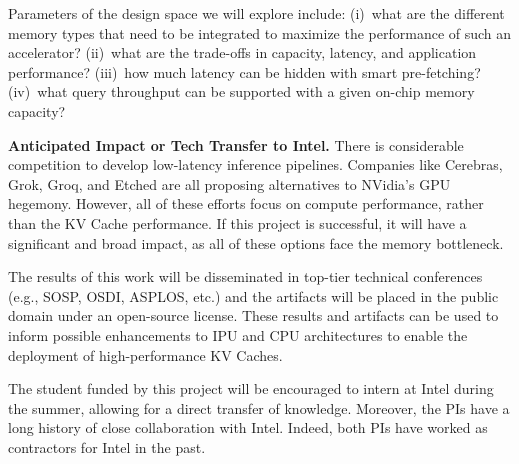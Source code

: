 \documentclass[11pt]{article}
\def\PAR#1{\par\medskip\noindent\textbf{#1}}
\begin{document}
Parameters of the design space we will explore include: (i)~what are
the different memory types that need to be integrated to maximize the
performance of such an accelerator? (ii)~what are the trade-offs in
capacity, latency, and application performance? (iii)~how much latency
can be hidden with smart pre-fetching? (iv)~what query throughput can
be supported with a given on-chip memory capacity?




\PAR{Anticipated Impact or Tech Transfer to Intel.}
%
There is considerable competition to develop low-latency
inference pipelines. Companies like Cerebras, Grok, Groq, and
Etched are all proposing alternatives to NVidia's GPU
hegemony. However, all of these efforts focus on compute
performance, rather than the KV Cache performance. If this
project is successful, it will have a significant and broad
impact, as all of these options face the memory bottleneck.

The results of this work will be disseminated in top-tier technical
conferences (e.g., SOSP, OSDI, ASPLOS, etc.) and the artifacts will be
placed in the public domain under an open-source license.
These results and artifacts can be used to inform possible
enhancements to IPU and CPU architectures to enable
the deployment of high-performance KV Caches.

The student funded by this project will be encouraged to intern
at Intel during the summer, allowing for a direct transfer of
knowledge. Moreover, the PIs have a long history of close
collaboration with Intel. Indeed, both PIs have worked as
contractors for Intel in the past.
\end{document}
